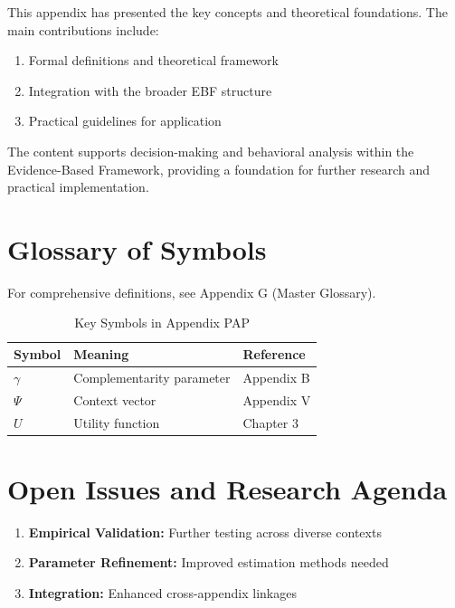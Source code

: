 This appendix has presented the key concepts and theoretical foundations.
The main contributions include:

\begin{enumerate}
    \item Formal definitions and theoretical framework
    \item Integration with the broader EBF structure
    \item Practical guidelines for application
\end{enumerate}

The content supports decision-making and behavioral analysis within the
Evidence-Based Framework, providing a foundation for further research
and practical implementation.


\section{Glossary of Symbols}
\label{sec:pap-glossary}

For comprehensive definitions, see Appendix G (Master Glossary).

\begin{table}[htbp]
\centering
\caption{Key Symbols in Appendix PAP}
\begin{tabular}{lll}
\toprule
\textbf{Symbol} & \textbf{Meaning} & \textbf{Reference} \\
\midrule
$\gamma$ & Complementarity parameter & Appendix B \\
$\Psi$ & Context vector & Appendix V \\
$U$ & Utility function & Chapter 3 \\
\bottomrule
\end{tabular}
\end{table}



\section{Open Issues and Research Agenda}
\label{sec:pap-open}

\begin{enumerate}
    \item \textbf{Empirical Validation:} Further testing across diverse contexts
    \item \textbf{Parameter Refinement:} Improved estimation methods needed
    \item \textbf{Integration:} Enhanced cross-appendix linkages
\end{enumerate}

